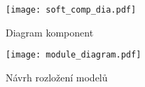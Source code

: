 \begin{figure}[H]
    \centering
    \texttt{[image: soft\_comp\_dia.pdf]}
    \caption{Diagram komponent}
    \label{fig:softCompDia}
\end{figure}

\begin{figure}[h]
    \centering
    \texttt{[image: module\_diagram.pdf]}
    \caption{Návrh rozložení modelů}
    \label{fig:moduleDia}
\end{figure}